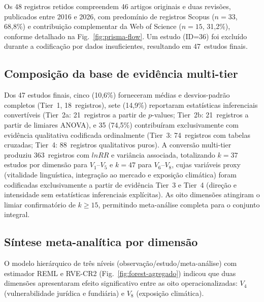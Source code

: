 \documentclass[12pt,a4paper]{article}
\begin{document}
Os 48 registros retidos compreendem 46 artigos originais e duas revisões, publicados entre 2016 e 2026, com predomínio de registros Scopus ($n = 33$, 68,8\%) e contribuição complementar da Web of Science ($n = 15$, 31,2\%), conforme detalhado na Fig.~\ref{fig:prisma-flow}. Um estudo (ID=36) foi excluído durante a codificação por dados insuficientes, resultando em 47~estudos finais.

\subsection{Composição da base de evidência multi-tier}
\label{sec:tier-composition}

Dos 47 estudos finais, cinco (10,6\%) forneceram médias e desvios-padrão completos (Tier~1, 18~registros), sete (14,9\%) reportaram estatísticas inferenciais convertíveis (Tier~2a: 21~registros a partir de $p$-values; Tier~2b: 21~registros a partir de limiares ANOVA), e 35 (74,5\%) contribuíram exclusivamente com evidência qualitativa codificada ordinalmente (Tier~3: 74~registros com tabelas cruzadas; Tier~4: 88~registros qualitativos puros). A conversão multi-tier produziu 363~registros com $lnRR$ e variância associada, totalizando $k = 37$ estudos por dimensão para $V_1$--$V_5$ e $k = 47$ para $V_6$--$V_8$, cujas variáveis proxy (vitalidade linguística, integração ao mercado e exposição climática) foram codificadas exclusivamente a partir de evidência Tier~3 e Tier~4 (direção e intensidade sem estatísticas inferenciais explícitas). As oito dimensões atingiram o limiar confirmatório de $k \geq 15$, permitindo meta-análise completa para o conjunto integral.

\subsection{Síntese meta-analítica por dimensão}
\label{sec:meta-results}

O modelo hierárquico de três níveis (observação/estudo/meta-análise) com estimador REML e RVE-CR2 (Fig.~\ref{fig:forest-agregado}) indicou que duas dimensões apresentaram efeito significativo entre as oito operacionalizadas: $V_4$ (vulnerabilidade jurídica e fundiária) e $V_8$ (exposição climática).
\end{document}
